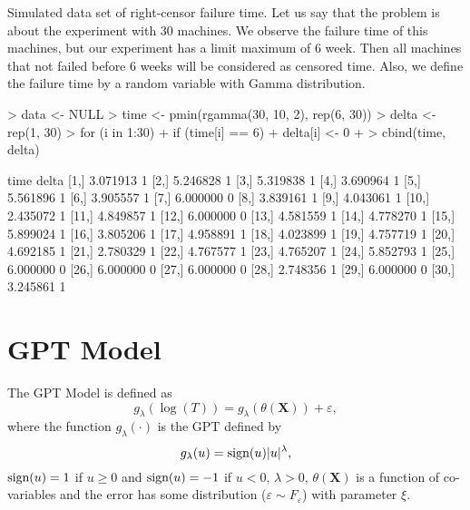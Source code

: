\documentclass[nogin,letterpaper,12pt]{article}
\begin{document}
\begin{Example}
\label{ex1}
Simulated data set of right-censor failure time. Let us say that the problem is about the experiment with 30 machines. We observe the failure time of this machines, but our experiment has a limit maximum of 6 week. Then all machines that not failed before 6 weeks will be considered as censored time. Also, we define the failure time by a random variable with Gamma distribution.
\begin{Schunk}
\begin{Sinput}
> data <- NULL
> time <- pmin(rgamma(30, 10, 2), rep(6, 30))
> delta <- rep(1, 30)
> for (i in 1:30) {
+     if (time[i] == 6) 
+         delta[i] <- 0
+ }
> cbind(time, delta)
\end{Sinput}
\begin{Soutput}
          time delta
 [1,] 3.071913     1
 [2,] 5.246828     1
 [3,] 5.319838     1
 [4,] 3.690964     1
 [5,] 5.561896     1
 [6,] 3.905557     1
 [7,] 6.000000     0
 [8,] 3.839161     1
 [9,] 4.043061     1
[10,] 2.435072     1
[11,] 4.849857     1
[12,] 6.000000     0
[13,] 4.581559     1
[14,] 4.778270     1
[15,] 5.899024     1
[16,] 3.805206     1
[17,] 4.958891     1
[18,] 4.023899     1
[19,] 4.757719     1
[20,] 4.692185     1
[21,] 2.780329     1
[22,] 4.767577     1
[23,] 4.765207     1
[24,] 5.852793     1
[25,] 6.000000     0
[26,] 6.000000     0
[27,] 6.000000     0
[28,] 2.748356     1
[29,] 6.000000     0
[30,] 3.245861     1
\end{Soutput}
\end{Schunk}
\end{Example}

\section{GPT Model}
\label{GPTsec}

The GPT Model is defined as
\begin{equation}
\label{GPTmodel}
g_\lambda(\log(T)) = g_\lambda(\theta(\mathbf{X})) + \varepsilon,
\end{equation}
\noindent
where the function $g_\lambda(\cdot)$ is the GPT defined by
\begin{equation}
\label{gl}
g_\lambda(u) = \textnormal{sign}(u) |u|^\lambda,
\end{equation}
\noindent
$\textnormal{sign}(u) = 1$ if $u \geq 0$ and $\textnormal{sign}(u) = -1$ if $u < 0$, $\lambda > 0$, $\theta(\mathbf{X})$ is a function of co-variables and the error has some distribution ($\varepsilon \sim F_\varepsilon$) with parameter $\xi$.
\end{document}
